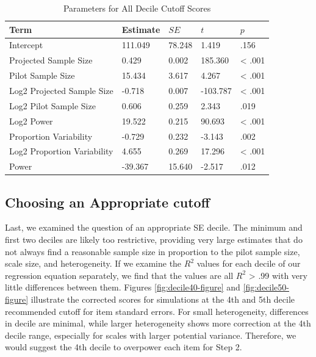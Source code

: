 \documentclass[
  man]{apa7}
\begin{document}
\begin{table}[tbp]

\begin{center}
\begin{threeparttable}

\caption{\label{tab:table-correction}Parameters for All Decile Cutoff Scores}

\begin{tabular}{lllll}
\toprule
Term & Estimate & $SE$ & $t$ & $p$\\
\midrule
Intercept & 111.049 & 78.248 & 1.419 & .156\\
Projected Sample Size & 0.429 & 0.002 & 185.360 & < .001\\
Pilot Sample Size & 15.434 & 3.617 & 4.267 & < .001\\
Log2 Projected Sample Size & -0.718 & 0.007 & -103.787 & < .001\\
Log2 Pilot Sample Size & 0.606 & 0.259 & 2.343 & .019\\
Log2 Power & 19.522 & 0.215 & 90.693 & < .001\\
Proportion Variability & -0.729 & 0.232 & -3.143 & .002\\
Log2 Proportion Variability & 4.655 & 0.269 & 17.296 & < .001\\
Power & -39.367 & 15.640 & -2.517 & .012\\
\bottomrule
\end{tabular}

\end{threeparttable}
\end{center}

\end{table}

\subsection{Choosing an Appropriate cutoff}\label{choosing-an-appropriate-cutoff}

Last, we examined the question of an appropriate SE decile. The minimum and first two deciles are likely too restrictive, providing very large estimates that do not always find a reasonable sample size in proportion to the pilot sample size, scale size, and heterogeneity. If we examine the \(R^2\) values for each decile of our regression equation separately, we find that the values are all \(R^2\) \textgreater{} .99 with very little differences between them. Figures \ref{fig:decile40-figure} and \ref{fig:decile50-figure} illustrate the corrected scores for simulations at the 4th and 5th decile recommended cutoff for item standard errors. For small heterogeneity, differences in decile are minimal, while larger heterogeneity shows more correction at the 4th decile range, especially for scales with larger potential variance. Therefore, we would suggest the 4th decile to overpower each item for Step 2.
\end{document}
